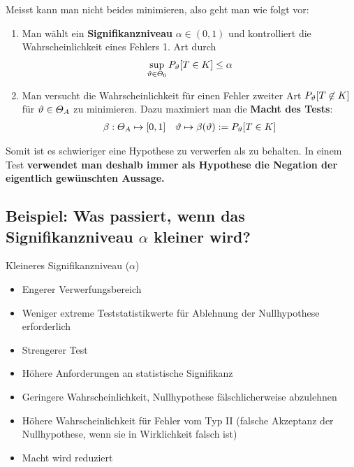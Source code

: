 Meisst kann man nicht beides minimieren, also geht man wie folgt vor:
\begin{enumerate}
  \item Man wählt ein \textbf{Signifikanzniveau} $\alpha \in (0, 1)$ und kontrolliert
        die Wahrscheinlichkeit eines Fehlers 1. Art durch
        \begin{align*}
          \sup_{\vartheta \in \varTheta_0} P_\vartheta[T \in K] \leq \alpha
        \end{align*}
  \item Man versucht die Wahrscheinlichkeit für einen Fehler zweiter Art $P_\vartheta[T \not
            \in K]$ für $\vartheta \in \varTheta_A$ zu minimieren. Dazu maximiert man die
        \textbf{Macht des Tests}:
        \begin{align*}
          \beta : \varTheta_A \mapsto [0, 1] &  & \vartheta \mapsto \beta (\vartheta) := P_\vartheta[T \in K]
        \end{align*}
\end{enumerate}
Somit ist es schwieriger eine Hypothese zu verwerfen als zu behalten. In einem
Test \textbf{verwendet man deshalb immer als Hypothese die Negation der eigentlich gewünschten Aussage.}
\BoxStart{}
\subsection*{Beispiel: Was passiert, wenn das Signifikanzniveau $\alpha$ kleiner wird?}
Kleineres Signifikanzniveau ($\alpha$)
\begin{itemize}
  \item Engerer Verwerfungsbereich
  \item Weniger extreme Teststatistikwerte für Ablehnung der Nullhypothese erforderlich
  \item Strengerer Test
  \item Höhere Anforderungen an statistische Signifikanz
  \item Geringere Wahrscheinlichkeit, Nullhypothese fälschlicherweise abzulehnen
  \item Höhere Wahrscheinlichkeit für Fehler vom Typ II (falsche Akzeptanz der Nullhypothese, wenn sie in Wirklichkeit falsch ist)
  \item Macht wird reduziert
\end{itemize}
\BoxEnd{}

\BoxStart{}
